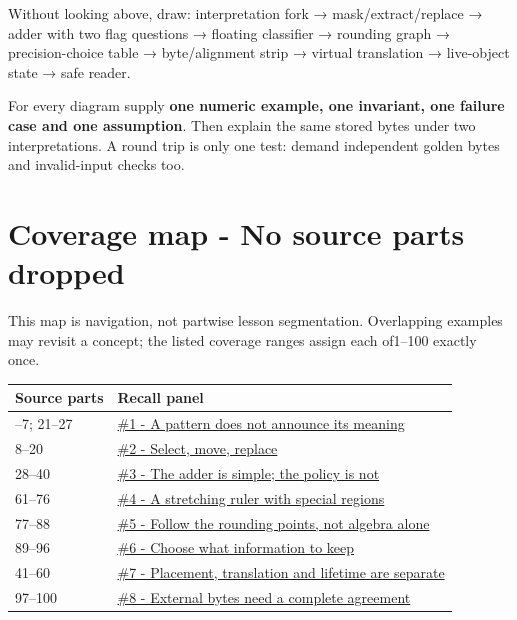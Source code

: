Without looking above, draw: interpretation fork → mask/extract/replace → adder with two flag questions → floating classifier → rounding graph → precision-choice table → byte/alignment strip → virtual translation → live-object state → safe reader.

For every diagram supply \textbf{one numeric example, one invariant, one failure case and one assumption}. Then explain the same stored bytes under two interpretations. A round trip is only one test: demand independent golden bytes and invalid-input checks too.

\section{Coverage map - No source parts dropped}\label{appendix-ef4d27797a92-coverage-map---no-source-parts-dropped}

This map is navigation, not partwise lesson segmentation. Overlapping examples may revisit a concept; the listed coverage ranges assign each of1--100 exactly once.

{\def\LTcaptype{none} %
\begin{longtable}[]{@{}ll@{}}
\toprule\noalign{}
Source parts & Recall panel \\
\midrule\noalign{}
\endhead
\bottomrule\noalign{}
\endlastfoot
1--7; 21--27 & \hyperref[appendix-ef4d27797a92-a-pattern-does-not-announce-its-meaning]{\#1 - A pattern does not announce its meaning} \\
8--20 & \hyperref[appendix-ef4d27797a92-select-move-replace]{\#2 - Select, move, replace} \\
28--40 & \hyperref[appendix-ef4d27797a92-the-adder-is-simple-the-policy-is-not]{\#3 - The adder is simple; the policy is not} \\
61--76 & \hyperref[appendix-ef4d27797a92-a-stretching-ruler-with-special-regions]{\#4 - A stretching ruler with special regions} \\
77--88 & \hyperref[appendix-ef4d27797a92-follow-the-rounding-points-not-algebra-alone]{\#5 - Follow the rounding points, not algebra alone} \\
89--96 & \hyperref[appendix-ef4d27797a92-choose-what-information-to-keep]{\#6 - Choose what information to keep} \\
41--60 & \hyperref[appendix-ef4d27797a92-placement-translation-and-lifetime-are-separate]{\#7 - Placement, translation and lifetime are separate} \\
97--100 & \hyperref[appendix-ef4d27797a92-external-bytes-need-a-complete-agreement]{\#8 - External bytes need a complete agreement} \\
\end{longtable}
}

